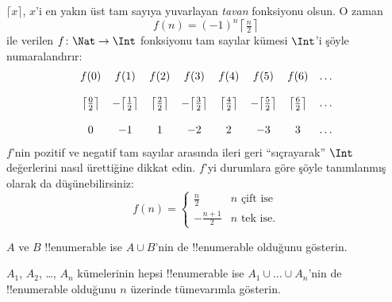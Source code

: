 \begin{ex}
$\lceil x\rceil$, $x$'i en yakın üst tam sayıya yuvarlayan \emph{tavan}
fonksiyonu olsun. O zaman
\[
  f(n) = (-1)^{n} \left\lceil\tfrac{n}{2}\right\rceil
\]
ile verilen $f\colon\Nat\to\Int$ fonksiyonu tam sayılar kümesi $\Int$'i
şöyle numaralandırır:
\[
\begin{array}{c c c c c c c c}
f(0) & f(1) & f(2) & f(3) & f(4) & f(5) & f(6) & \dots \\ \\
\big\lceil \tfrac{0}{2} \big\rceil & -\big\lceil \tfrac{1}{2}\big\rceil &  \big\lceil \tfrac{2}{2} \big\rceil & -\big\lceil \tfrac{3}{2} \big\rceil & \big\lceil \tfrac{4}{2} \big\rceil  & -\big\lceil \tfrac{5}{2}\big\rceil & \big\lceil \tfrac{6}{2} \big\rceil & \dots \\ \\
0 & -1 & 1 & -2 & 2 & -3 & 3& \dots
\end{array}
\]
$f$'nin pozitif ve negatif tam sayılar arasında ileri geri ``sıçrayarak''
$\Int$ değerlerini nasıl ürettiğine dikkat edin. $f$'yi durumlara göre şöyle
tanımlanmış olarak da düşünebilirsiniz:
\[
f(n) = \begin{cases}
  \frac{n}{2} & \text{$n$ çift ise}\\
  -\frac{n+1}{2} & \text{$n$ tek ise.}
  \end{cases}
\]
\end{ex}

\begin{prob}
$A$ ve $B$ !!{enumerable} ise $A\cup B$'nin de !!{enumerable} olduğunu
gösterin.
\end{prob}

\begin{prob}
$A_1$, $A_2$, \dots, $A_n$ kümelerinin hepsi !!{enumerable} ise
$A_1\cup\dots\cup A_n$'nin de !!{enumerable} olduğunu $n$ üzerinde
tümevarımla gösterin.
\end{prob}

